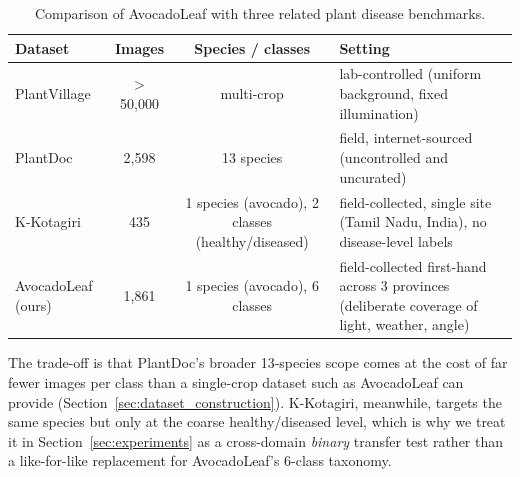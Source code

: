 \begin{table}[htbp]
\centering
\caption{Comparison of AvocadoLeaf with three related plant disease benchmarks.}
\label{tab:dataset_comparison}
\small
\begin{tabularx}{\textwidth}{l c c X}
\toprule
\textbf{Dataset} & \textbf{Images} & \textbf{Species / classes} & \textbf{Setting} \\
\midrule
PlantVillage \citep{hughes2015plant} & $>$50,000 & multi-crop & lab-controlled (uniform background, fixed illumination) \\
PlantDoc \citep{singh2020plantdoc} & 2,598 & 13 species & field, internet-sourced (uncontrolled and uncurated) \\
K-Kotagiri \citeyearpar{kotagiri2024avocado} & 435 & 1 species (avocado), 2 classes (healthy/diseased) & field-collected, single site (Tamil Nadu, India), no disease-level labels \\
AvocadoLeaf (ours) & 1,861 & 1 species (avocado), 6 classes & field-collected first-hand across 3 provinces (deliberate coverage of light, weather, angle) \\
\bottomrule
\end{tabularx}
\end{table}

The trade-off is that PlantDoc's broader 13-species scope comes at the cost of far fewer images per class than a single-crop dataset such as AvocadoLeaf can provide (Section~\ref{sec:dataset_construction}). K-Kotagiri, meanwhile, targets the same species but only at the coarse healthy/diseased level, which is why we treat it in Section~\ref{sec:experiments} as a cross-domain \emph{binary} transfer test rather than a like-for-like replacement for AvocadoLeaf's 6-class taxonomy.

